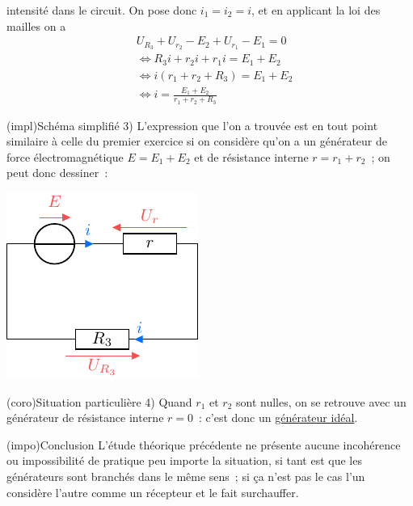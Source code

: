 \documentclass[../../main/main.tex]{subfiles}
\begin{document}
{\begin{enumerate}
\begin{tcbraster}[raster columns=9, raster equal height=rows]
\begin{tcb}[raster multicolumn=4]
        intensité dans le circuit. On pose donc $i_1 = i_2 = i$, et en applicant
        la loi des mailles on a
        \begin{align*}
            & U_{R_3} + U_{r_2} - E_2 + U_{r_1} - E_1 =
                0\\
            & \Leftrightarrow R_3i + r_2i + r_1i =
                E_1 + E_2\\
            & \Leftrightarrow i \left( r_1+r_2+R_3 \right) =
                E_1 + E_2\\
            & \Leftrightarrow \boxed{i = \frac{E_1 + E_2}{r_1+r_2+R_3}}
        \end{align*}
    \end{tcb}    
    \begin{tcb}[raster multicolumn=5](impl){Schéma simplifié}
        3)
        L'expression que l'on a trouvée est en tout point similaire à celle du
        premier exercice si on considère qu'on a un générateur de force
        électromagnétique $E = E_1 + E_2$ et de résistance interne $r = r_1 +
        r_2$~; on peut donc dessiner~:
        \begin{center}
            \includegraphics{assogen_ser-simple}
        \end{center}
    \end{tcb}
\end{tcbraster}
\begin{tcbraster}[raster columns=2, raster equal height=rows]
    \begin{tcb}(coro){Situation particulière}
        4)
        Quand $r_1$ et $r_2$ sont nulles, on se retrouve avec un générateur de
        résistance interne $r = 0$~: c'est donc un \underline{générateur idéal}.
    \end{tcb}
    \begin{tcb}(impo){Conclusion}
        L'étude théorique précédente ne présente aucune incohérence ou
        impossibilité de pratique peu importe la situation, si tant est que les
        générateurs sont branchés dans le même sens~; si ça n'est pas le cas
        l'un considère l'autre comme un récepteur et le fait surchauffer.
    \end{tcb}
\end{tcbraster}


\end{enumerate}}
\end{document}
